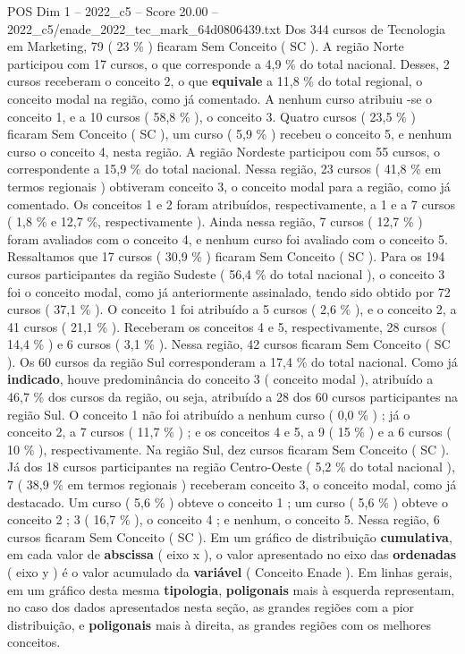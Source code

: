 \begin{textsample}{POS Dim 1 – 2022\_c5 – Score 20.00 – 2022\_c5/enade\_2022\_tec\_mark\_64d0806439.txt}
Dos 344 cursos de Tecnologia em Marketing, 79 ( 23 \% ) ficaram Sem Conceito ( SC ).
A região Norte participou com 17 cursos, o que corresponde a 4,9 \% do total nacional.
Desses, 2 cursos receberam o conceito 2, o que \textbf{equivale} a 11,8 \% do total regional, o conceito modal na região, como já comentado.
A nenhum curso atribuiu -se o conceito 1, e a 10 cursos ( 58,8 \% ), o conceito 3.
Quatro cursos ( 23,5 \% ) ficaram Sem Conceito ( SC ), um curso ( 5,9 \% ) recebeu o conceito 5, e nenhum curso o conceito 4, nesta região.
A região Nordeste participou com 55 cursos, o correspondente a 15,9 \% do total nacional.
Nessa região, 23 cursos ( 41,8 \% em termos regionais ) obtiveram conceito 3, o conceito modal para a região, como já comentado.
Os conceitos 1 e 2 foram atribuídos, respectivamente, a 1 e a 7 cursos ( 1,8 \% e 12,7 \%, respectivamente ).
Ainda nessa região, 7 cursos ( 12,7 \% ) foram avaliados com o conceito 4, e nenhum curso foi avaliado com o conceito 5.
Ressaltamos que 17 cursos ( 30,9 \% ) ficaram Sem Conceito ( SC ).
Para os 194 cursos participantes da região Sudeste ( 56,4 \% do total nacional ), o conceito 3 foi o conceito modal, como já anteriormente assinalado, tendo sido obtido por 72 cursos ( 37,1 \% ).
O conceito 1 foi atribuído a 5 cursos ( 2,6 \% ), e o conceito 2, a 41 cursos ( 21,1 \% ).
Receberam os conceitos 4 e 5, respectivamente, 28 cursos ( 14,4 \% ) e 6 cursos ( 3,1 \% ).
Nessa região, 42 cursos ficaram Sem Conceito ( SC ).
Os 60 cursos da região Sul corresponderam a 17,4 \% do total nacional.
Como já \textbf{indicado}, houve predominância do conceito 3 ( conceito modal ), atribuído a 46,7 \% dos cursos da região, ou seja, atribuído a 28 dos 60 cursos participantes na região Sul.
O conceito 1 não foi atribuído a nenhum curso ( 0,0 \% ) ; já o conceito 2, a 7 cursos ( 11,7 \% ) ; e os conceitos 4 e 5, a 9 ( 15 \% ) e a 6 cursos ( 10 \% ), respectivamente.
Na região Sul, dez cursos ficaram Sem Conceito ( SC ).
Já dos 18 cursos participantes na região Centro-Oeste ( 5,2 \% do total nacional ), 7 ( 38,9 \% em termos regionais ) receberam conceito 3, o conceito modal, como já destacado.
Um curso ( 5,6 \% ) obteve o conceito 1 ; um curso ( 5,6 \% ) obteve o conceito 2 ; 3 ( 16,7 \% ), o conceito 4 ; e nenhum, o conceito 5.
Nessa região, 6 cursos ficaram Sem Conceito ( SC ).
Em um gráfico de distribuição \textbf{cumulativa}, em cada valor de \textbf{abscissa} ( eixo x ), o valor apresentado no eixo das \textbf{ordenadas} ( eixo y ) é o valor acumulado da \textbf{variável} ( Conceito Enade ).
Em linhas gerais, em um gráfico desta mesma \textbf{tipologia}, \textbf{poligonais} mais à esquerda representam, no caso dos dados apresentados nesta seção, as grandes regiões com a pior distribuição, e \textbf{poligonais} mais à direita, as grandes regiões com os melhores conceitos.

\end{textsample}
